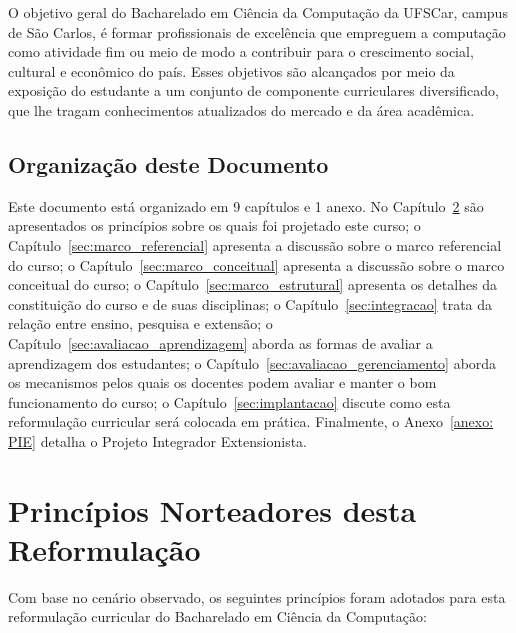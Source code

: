O objetivo geral do Bacharelado em Ciência da Computação da UFSCar, campus de São Carlos, é formar profissionais de excelência que empreguem a computação como atividade fim ou meio de modo a contribuir para o crescimento social, cultural e econômico do país. Esses objetivos são alcançados por meio da exposição do estudante a um conjunto de componente curriculares diversificado, que lhe tragam conhecimentos atualizados do mercado e da área acadêmica.



\section{Organização deste Documento}

Este documento está organizado em 9 capítulos e 1 anexo. No Capítulo~\ref{sec:principios} são apresentados os princípios sobre os quais foi projetado este curso; o Capítulo~\ref{sec:marco_referencial} apresenta a discussão sobre o marco referencial do curso; o Capítulo~\ref{sec:marco_conceitual} apresenta a discussão sobre o marco conceitual do curso; o Capítulo~\ref{sec:marco_estrutural} apresenta os detalhes da constituição do curso e de suas disciplinas; o Capítulo~\ref{sec:integracao} trata da relação entre ensino, pesquisa e extensão; o Capítulo~\ref{sec:avaliacao_aprendizagem} aborda as formas de avaliar a aprendizagem dos estudantes; o Capítulo~\ref{sec:avaliacao_gerenciamento} aborda os mecanismos pelos quais os docentes podem avaliar e manter o bom funcionamento do curso; o Capítulo~\ref{sec:implantacao} discute como esta reformulação curricular será colocada em prática. Finalmente, o Anexo~\ref{anexo: PIE} detalha o Projeto Integrador Extensionista.



\chapter{Princípios Norteadores desta Reformulação} \label{sec:principios}


Com base no cenário observado, os seguintes princípios foram adotados para esta reformulação curricular do Bacharelado em Ciência da Computação:

